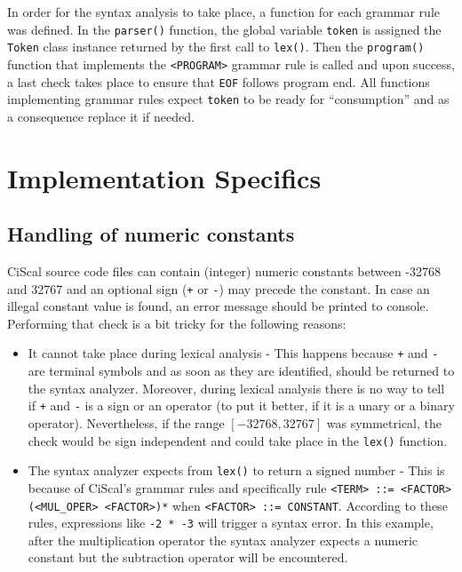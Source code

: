\documentclass{article}
\def\code#1{\texttt{#1}} %
\begin{document}
In order for the syntax analysis to take place, a function for each grammar rule was defined. 
In the \code{parser()} function, the global variable \code{token} is assigned the
\code{Token} class instance returned by the first call to \code{lex()}. Then the \code{program()}
function that implements the \code{<PROGRAM>} grammar rule is called and upon success, a last
check takes place to ensure that \code{EOF} follows program end. All functions implementing
grammar rules expect \code{token} to be ready for ``consumption'' and as a consequence 
replace it if needed.

\section{Implementation Specifics}
\subsection{Handling of numeric constants}
CiScal source code files can contain (integer) numeric constants between -32768 and 32767 and
an optional sign (\code{+} or \code{-}) may precede the constant. In case an illegal constant
value is found, an error message should be printed to console. Performing that
check is a bit tricky for the following reasons:
\begin{itemize}
 \item It cannot take place during lexical analysis - This happens because \code{+} and \code{-}
       are terminal symbols and as soon as they are identified, should be returned to the syntax
       analyzer. Moreover, during lexical analysis there is no way to tell if \code{+} and \code{-}
       is a sign or an operator (to put it better, if it is a unary or a binary operator).
       Nevertheless, if the range $[-32768, 32767]$ was symmetrical, the check would be sign
       independent and could take place in the \code{lex()} function.
 \item The syntax analyzer expects from \code{lex()} to return a signed number - This is because
       of CiScal's grammar rules and specifically rule \code{<TERM> ::= <FACTOR> (<MUL\_OPER> <FACTOR>)*}
       when \code{<FACTOR> ::= CONSTANT}. According to these rules, expressions like \code{-2 * -3}
       will trigger a syntax error. In this example, after the multiplication operator the syntax
       analyzer expects a numeric constant but the subtraction operator will be encountered.
\end{itemize}
\end{document}

